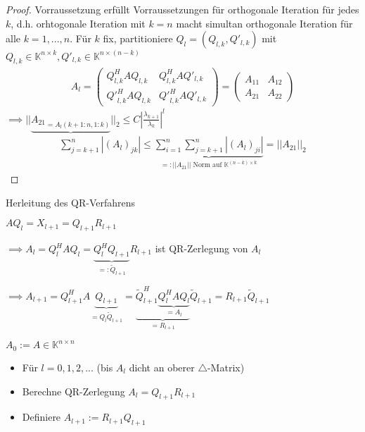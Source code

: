 \begin{proof}
	Vorraussetzung erfüllt Vorraussetzungen für orthogonale Iteration für jedes $k$, d.h. orhtogonale Iteration mit $k=n$ macht simultan orthogonale Iteration für alle $k=1, ..., n$. Für $k$ fix, partitioniere $Q_l = (Q_{l,k}, Q'_{l,k})$ mit $Q_{l,k} \in \mathbb{K}^{n\times k}, Q'_{l,k} \in \mathbb{K}^{n\times (n-k)}$
	\begin{align*}
		A_l = \left(\begin{matrix}
			Q_{l,k}^HAQ_{l,k} & Q_{l,k}^HAQ'_{l,k}\\
			{Q'}_{l,k}^HAQ_{l,k} & {Q'}_{l,k}^HAQ'_{l,k}
		\end{matrix}\right) = \left(\begin{matrix}
			A_{11} & A_{12}\\
			A_{21} & A_{22}
		\end{matrix}\right)
	\end{align*}
	$\implies ||\underbrace{{A_{21}}_{=A_l(k+1:n, 1:k)}}||_2 \leq C \left|\frac{\lambda_{k+1}}{\lambda_k}\right|^l$
	\begin{align*}
		\sum_{j=k+1}^{n} |(A_l)_{jk}| \leq \underbrace{\sum_{i=1}^{n} \sum_{j=k+1}^{n} |(A_l)_{ji}| }_{=:||A_{21}|| \text{ Norm auf } \mathbb{K}^{(n-k)\times k}} = ||A_{21}||_2
	\end{align*}
\end{proof}

Herleitung des QR-Verfahrens

$AQ_l = X_{l+1} = Q_{l+1}R_{l+1}$

$\implies A_l = Q_l^HAQ_l = \underbrace{Q_l^HQ_{l+1}}_{=:\tilde{Q}_{l+1}}R_{l+1}$ ist QR-Zerlegung von $A_l$

$\implies A_{l+1} = Q_{l+1}^HA\underbrace{Q_{l+1}}_{=Q_l\tilde{Q}_{l+1}} = \underbrace{\tilde{Q}_{l+1}^H \underbrace{Q_l^HAQ_l}_{=A_l}}_{=R_{l+1}}\tilde{Q}_{l+1} = R_{l+1}\tilde{Q}_{l+1}$

\begin{algorithm}[QR-Zerlegung]
	$A_0 := A \in \mathbb{K}^{n\times n}$
	\begin{itemize}
		\item Für $l=0, 1,2, ...$ (bis $A_l$ dicht an oberer $\triangle$-Matrix)
		\item \hspace{0.5cm} Berechne QR-Zerlegung $A_l = Q_{l+1}R_{l+1}$
		\item \hspace{0.5cm} Definiere $A_{l+1} := R_{l+1}Q_{l+1}$
	\end{itemize}
\end{algorithm}

